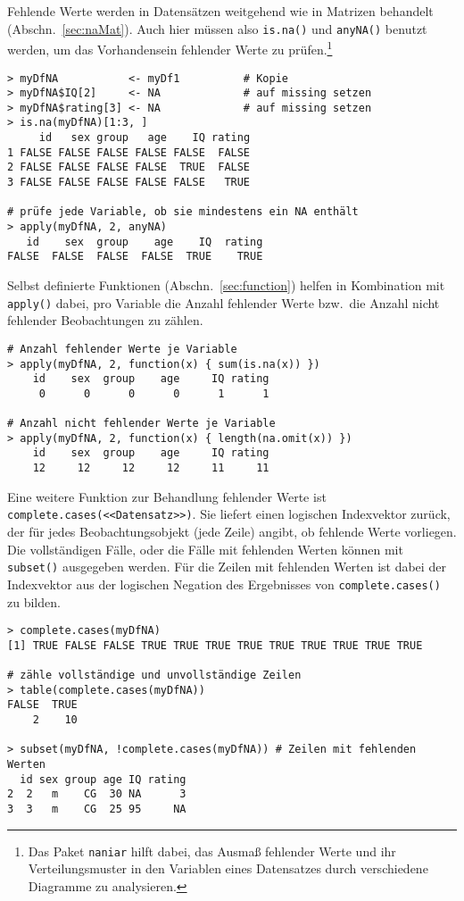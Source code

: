 Fehlende Werte werden in Datensätzen weitgehend wie in Matrizen behandelt (Abschn.\ \ref{sec:naMat}). Auch hier müssen also \lstinline!is.na()! und \lstinline!anyNA()! benutzt werden, um das Vorhandensein fehlender Werte zu prüfen.\footnote{Das Paket \lstinline!naniar! \cite{Tierney2019} hilft dabei, das Ausmaß fehlender Werte und ihr Verteilungsmuster in den Variablen eines Datensatzes durch verschiedene Diagramme zu analysieren.}
\begin{lstlisting}
> myDfNA           <- myDf1          # Kopie
> myDfNA$IQ[2]     <- NA             # auf missing setzen
> myDfNA$rating[3] <- NA             # auf missing setzen
> is.na(myDfNA)[1:3, ]
     id   sex group   age    IQ rating
1 FALSE FALSE FALSE FALSE FALSE  FALSE
2 FALSE FALSE FALSE FALSE  TRUE  FALSE
3 FALSE FALSE FALSE FALSE FALSE   TRUE

# prüfe jede Variable, ob sie mindestens ein NA enthält
> apply(myDfNA, 2, anyNA)
   id    sex  group    age    IQ  rating
FALSE  FALSE  FALSE  FALSE  TRUE    TRUE
\end{lstlisting}

Selbst definierte Funktionen (Abschn.\ \ref{sec:function}) helfen in Kombination mit \lstinline!apply()! dabei, pro Variable die Anzahl fehlender Werte bzw.\ die Anzahl nicht fehlender Beobachtungen zu zählen.
\begin{lstlisting}
# Anzahl fehlender Werte je Variable
> apply(myDfNA, 2, function(x) { sum(is.na(x)) })
    id    sex  group    age     IQ rating 
     0      0      0      0      1      1 

# Anzahl nicht fehlender Werte je Variable
> apply(myDfNA, 2, function(x) { length(na.omit(x)) })
    id    sex  group    age     IQ rating 
    12     12     12     12     11     11 
\end{lstlisting}

Eine weitere Funktion zur Behandlung fehlender Werte ist \lstinline!complete.cases(<<Datensatz>>)!. Sie liefert einen logischen Indexvektor zurück, der für jedes Beobachtungsobjekt (jede Zeile) angibt, ob fehlende Werte vorliegen. Die vollständigen Fälle, oder die Fälle mit fehlenden Werten können mit \lstinline!subset()! ausgegeben werden. Für die Zeilen mit fehlenden Werten ist dabei der Indexvektor aus der logischen Negation des Ergebnisses von \lstinline!complete.cases()! zu bilden.
\begin{lstlisting}
> complete.cases(myDfNA)
[1] TRUE FALSE FALSE TRUE TRUE TRUE TRUE TRUE TRUE TRUE TRUE TRUE

# zähle vollständige und unvollständige Zeilen
> table(complete.cases(myDfNA))
FALSE  TRUE 
    2    10

> subset(myDfNA, !complete.cases(myDfNA)) # Zeilen mit fehlenden Werten
  id sex group age IQ rating
2  2   m    CG  30 NA      3
3  3   m    CG  25 95     NA
\end{lstlisting}

